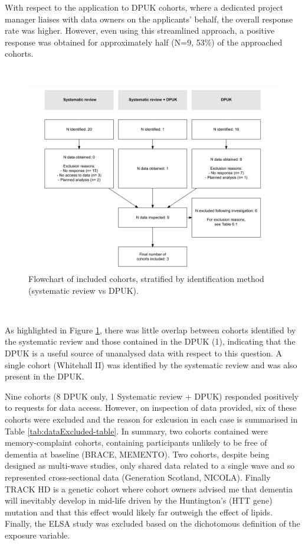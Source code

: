 \documentclass[a4paper, twoside]{templates/ociamthesis}
\begin{document}
With respect to the application to DPUK cohorts, where a dedicated project manager liaises with data owners on the applicants' behalf, the overall response rate was higher. However, even using this streamlined approach, a positive response was obtained for approximately half (N=9, 53\%) of the approached cohorts.

~





\begin{figure}[H]
\includegraphics[width=1\linewidth]{figures/ipd/cohortFlowchart} \caption[Flowchart]{Flowchart of included cohorts, stratified by identification method (systematic review vs DPUK).}\label{fig:cohortFlowchart}
\end{figure}

~

As highlighted in Figure \ref{fig:cohortFlowchart}, there was little overlap between cohorts identified by the systematic review and those contained in the DPUK (1), indicating that the DPUK is a useful source of unanalysed data with respect to this question. A single cohort (Whitehall II) was identified by the systematic review and was also present in the DPUK.

Nine cohorts (8 DPUK only, 1 Systematic review + DPUK) responded positively to requests for data access. However, on inspection of data provided, six of these cohorts were excluded and the reason for exlcusion in each case is summarised in Table \ref{tab:dataExcluded-table}. In summary, two cohorts contained were memory-complaint cohorts, containing participants unlikely to be free of dementia at baseline (BRACE, MEMENTO). Two cohorts, despite being designed as multi-wave studies, only shared data related to a single wave and so represented cross-sectional data (Generation Scotland, NICOLA). Finally TRACK HD is a genetic cohort where cohort owners advised me that dementia will inevitably develop in mid-life driven by the Huntington's (HTT gene) mutation and that this effect would likely far outweigh the effect of lipids. Finally, the ELSA study was excluded based on the dichotomous definition of the exposure variable.
\end{document}

